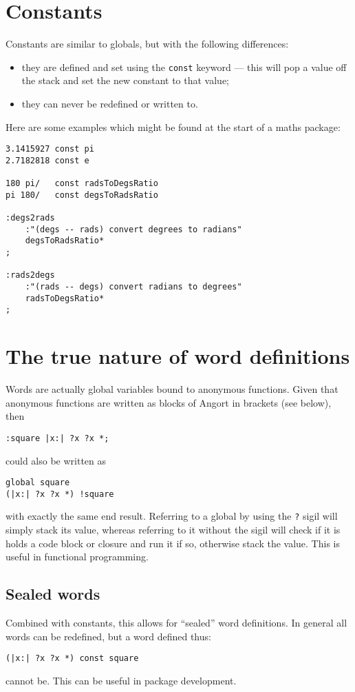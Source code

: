 \section{Constants}
Constants are similar to globals, but with the following differences:
\begin{itemize}
\item they are defined and set using the \texttt{const} keyword ---
this will pop a value off the stack and set the new constant to that value;
\item they can never be redefined or written to.
\end{itemize}
Here are some examples which might be found at the start of a maths
package:
\begin{lstlisting}
3.1415927 const pi
2.7182818 const e

180 pi/   const radsToDegsRatio
pi 180/   const degsToRadsRatio

:degs2rads
    :"(degs -- rads) convert degrees to radians"
    degsToRadsRatio*
;

:rads2degs
    :"(rads -- degs) convert radians to degrees"
    radsToDegsRatio*
;
\end{lstlisting}

\section{The true nature of word definitions}
\label{globdetails}
Words are actually global variables bound to anonymous functions.
Given that anonymous functions are written as blocks of Angort
in brackets (see below), then
\begin{lstlisting}
:square |x:| ?x ?x *;
\end{lstlisting}
could also be written as
\begin{lstlisting}
global square
(|x:| ?x ?x *) !square
\end{lstlisting}
with exactly the same end result. Referring to a global by using the \texttt{?} sigil
will simply stack its value, whereas referring to it without the sigil
will check if it is holds a code block or closure and run it if so, otherwise
stack the value. This is useful in functional programming.

\subsection{Sealed words}
Combined with constants, this allows for ``sealed'' word definitions. 
In general all words can be redefined, but a word defined thus:
\begin{lstlisting}
(|x:| ?x ?x *) const square
\end{lstlisting}
cannot be. This can be useful in package development.

